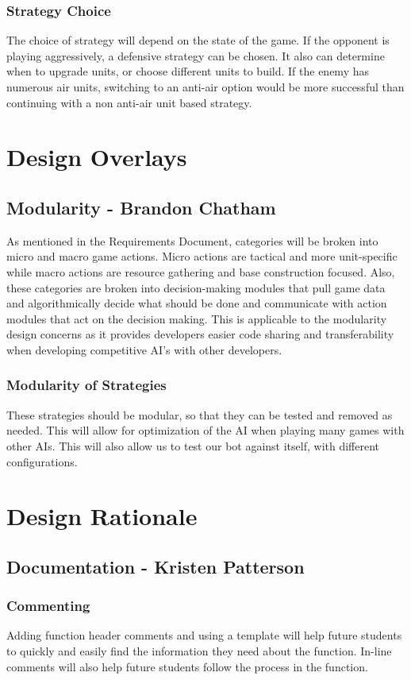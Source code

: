 \subsubsection{Strategy Choice}
	The choice of strategy will depend on the state of the game. If the opponent is playing aggressively, a defensive strategy can be chosen. It also can determine when to upgrade units, or choose different units to build. If the enemy has numerous air units, switching to an anti-air option would be more successful than continuing with a non anti-air unit based strategy. 

\section{Design Overlays}
\subsection{Modularity - Brandon Chatham}
	As mentioned in the Requirements Document, categories will be broken into micro and macro game actions. Micro actions are tactical and more unit-specific while macro actions are resource gathering and base construction focused. Also, these categories are broken into decision-making modules that pull game data and algorithmically decide what should be done and communicate with action modules that act on the decision making. This is applicable to the modularity design concerns as it provides developers easier code sharing and transferability when developing competitive AI's with other developers. 
\subsubsection{Modularity of Strategies}
	These strategies should be modular, so that they can be tested and removed as needed. This will allow for optimization of the AI when playing many games with other AIs. This will also allow us to test our bot against itself, with different configurations.
\section{Design Rationale}
\subsection{Documentation - Kristen Patterson}
\subsubsection{Commenting}
	Adding function header comments and using a template will help future students to quickly and easily find the information they need about the function. In-line comments will also help future students follow the process in the function.

